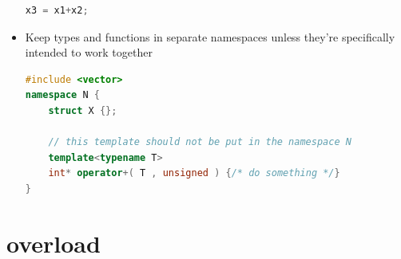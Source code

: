 \documentclass[a4paper,12pt,twoside]{book}
\begin{document}
\begin{itemize}
\begin{lstlisting}[frame=single, language=c++]
x3 = x1+x2;
\end{lstlisting}
	
	\item Keep types and functions in separate namespaces unless they're specifically intended to work together
	
\begin{lstlisting}[frame=single, language=c++]
#include <vector>
namespace N {
	struct X {};
	
	// this template should not be put in the namespace N
	template<typename T>
	int* operator+( T , unsigned ) {/* do something */}
}
\end{lstlisting}
\end{itemize}


\section{overload}
\end{document}
